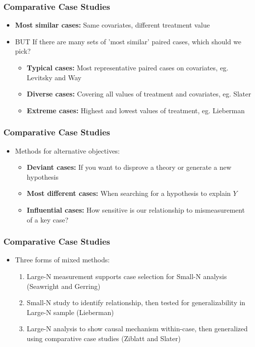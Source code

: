 \documentclass[xcolor=x11names,compress]{beamer}\usepackage[]{graphicx}\usepackage[]{color}
\renewcommand{\(}{\begin{columns}}
\renewcommand{\)}{\end{columns}}
\newcommand{\<}[1]{\begin{column}{#1}}
\renewcommand{\>}{\end{column}}
\begin{document}
\begin{frame}
\frametitle{Comparative Case Studies}
\begin{itemize}
\item \textbf{Most similar cases:} Same covariates, different treatment value
\pause
\item BUT If there are many sets of 'most similar' paired cases, which should we pick?
\pause
\begin{itemize}
\item \textbf{Typical cases:} Most representative paired cases on covariates, eg. Levitsky and Way
\pause
\item \textbf{Diverse cases:} Covering all values of treatment and covariates, eg. Slater
\pause
\item \textbf{Extreme cases:} Highest and lowest values of treatment, eg. Lieberman
\end{itemize}
\end{itemize}
\end{frame}


\begin{frame}
\frametitle{Comparative Case Studies}
\begin{itemize}
\item Methods for alternative objectives:
\pause
\begin{itemize}
\item \textbf{Deviant cases:} If you want to disprove a theory or generate a new hypothesis
\pause
\item \textbf{Most different cases:} When searching for a hypothesis to explain $Y$
\pause
\item \textbf{Influential cases:} How sensitive is our relationship to mismeasurement of a key case?
\end{itemize}
\end{itemize}
\end{frame}


\begin{frame}
\frametitle{Comparative Case Studies}
\begin{itemize}
\item Three forms of mixed methods:
\pause
\begin{enumerate}
\item Large-N measurement supports case selection for Small-N analysis (Seawright and Gerring)
\pause
\item Small-N study to identify relationship, then tested for generalizability in Large-N sample (Lieberman)
\pause
\item Large-N analysis to show causal mechanism within-case, then generalized using comparative case studies (Ziblatt and Slater)
\end{enumerate}
\end{itemize}
\end{frame}
\end{document}
